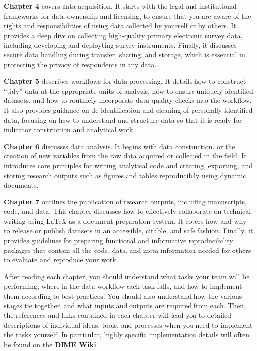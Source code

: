\textbf{Chapter 4} covers data acquisition. It starts with
the legal and institutional frameworks for data ownership and licensing,
to ensure that you are aware of the rights and responsibilities
of using data collected by yourself or by others.
It provides a deep dive on collecting high-quality primary electronic survey data,
including developing and deployting survey instruments.
Finally, it discusses secure data handling during transfer, sharing, and storage,
which is essential in protecting the privacy of respondents in any data.

\textbf{Chapter 5} describes workflows for data processing.
It details how to construct ``tidy'' data at the appropriate units of analysis,
how to ensure uniquely identified datasets, and
how to routinely incorporate data quality checks into the workflow.
It also provides guidance on de-identification and cleaning of personally-identified data,
focusing on how to understand and structure data
so that it is ready for indicator construction and analytical work.

\textbf{Chapter 6} discusses data analysis.
It begins with data construction, or the creation of new variables
from the raw data acquired or collected in the field.
It introduces core principles for writing analytical code
and creating, exporting, and storing research outputs
such as figures and tables reproducibily using dynamic documents.

\textbf{Chapter 7} outlines the publication of research outputs,
including manuscripts, code, and data.
This chapter discusses
how to effectively collaborate on technical writing
using {\LaTeX} as a document preparation system.
It covers how and why to release or publish datasets
in an accessible, citable, and safe fashion.
Finally, it provides guidelines for preparing
functional and informative reproducibility packages
that contain all the code, data, and meta-information needed
for others to evaluate and reproduce your work.

After reading each chapter, you should understand
what tasks your team will be performing,
where in the data workflow each task falls,
and how to implement them according to best practices.
You should also understand how the various stages tie together,
and what inputs and outputs are required from each.
Then, the references and links contained in each chapter
will lead you to detailed descriptions of individual
ideas, tools, and processes when you need to implement the tasks yourself.
In particular, highly specific implementation details
will often be found on the \textbf{DIME Wiki}.

